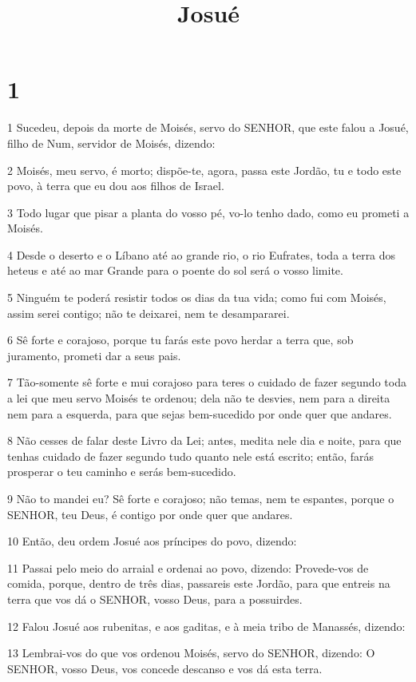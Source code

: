 

\title{Josué}


\chapter{1}

\par 1 Sucedeu, depois da morte de Moisés, servo do SENHOR, que este falou a Josué, filho de Num, servidor de Moisés, dizendo:
\par 2 Moisés, meu servo, é morto; dispõe-te, agora, passa este Jordão, tu e todo este povo, à terra que eu dou aos filhos de Israel.
\par 3 Todo lugar que pisar a planta do vosso pé, vo-lo tenho dado, como eu prometi a Moisés.
\par 4 Desde o deserto e o Líbano até ao grande rio, o rio Eufrates, toda a terra dos heteus e até ao mar Grande para o poente do sol será o vosso limite.
\par 5 Ninguém te poderá resistir todos os dias da tua vida; como fui com Moisés, assim serei contigo; não te deixarei, nem te desampararei.
\par 6 Sê forte e corajoso, porque tu farás este povo herdar a terra que, sob juramento, prometi dar a seus pais.
\par 7 Tão-somente sê forte e mui corajoso para teres o cuidado de fazer segundo toda a lei que meu servo Moisés te ordenou; dela não te desvies, nem para a direita nem para a esquerda, para que sejas bem-sucedido por onde quer que andares.
\par 8 Não cesses de falar deste Livro da Lei; antes, medita nele dia e noite, para que tenhas cuidado de fazer segundo tudo quanto nele está escrito; então, farás prosperar o teu caminho e serás bem-sucedido.
\par 9 Não to mandei eu? Sê forte e corajoso; não temas, nem te espantes, porque o SENHOR, teu Deus, é contigo por onde quer que andares.
\par 10 Então, deu ordem Josué aos príncipes do povo, dizendo:
\par 11 Passai pelo meio do arraial e ordenai ao povo, dizendo: Provede-vos de comida, porque, dentro de três dias, passareis este Jordão, para que entreis na terra que vos dá o SENHOR, vosso Deus, para a possuirdes.
\par 12 Falou Josué aos rubenitas, e aos gaditas, e à meia tribo de Manassés, dizendo:
\par 13 Lembrai-vos do que vos ordenou Moisés, servo do SENHOR, dizendo: O SENHOR, vosso Deus, vos concede descanso e vos dá esta terra.
